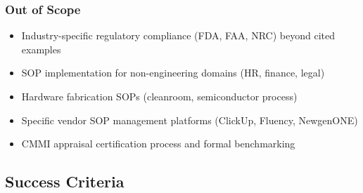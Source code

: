 \documentclass[11pt,letterpaper]{article}
\begin{document}
\subsubsection{Out of Scope}
\begin{itemize}[leftmargin=1.5em]
  \item Industry-specific regulatory compliance (FDA, FAA, NRC) beyond cited examples
  \item SOP implementation for non-engineering domains (HR, finance, legal)
  \item Hardware fabrication SOPs (cleanroom, semiconductor process)
  \item Specific vendor SOP management platforms (ClickUp, Fluency, NewgenONE)
  \item CMMI appraisal certification process and formal benchmarking
\end{itemize}

\subsection{Success Criteria}
\end{document}
